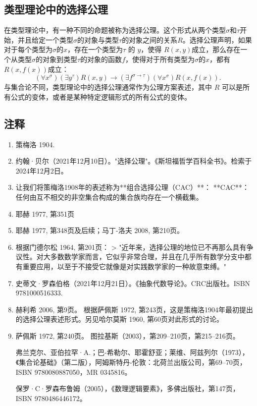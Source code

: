 \subsection{类型理论中的选择公理}  
在类型理论中，有一种不同的命题被称为选择公理。这个形式从两个类型\(\sigma\)和\(\tau\)开始，并且给定一个类型\(\sigma\)的对象与类型\(\tau\)的对象之间的关系\(R\)。选择公理声明，如果对于每个类型为\(\sigma\)的\(x\)，存在一个类型为\(\tau\) 的 \(y\)，使得 \(R(x,y)\)成立，那么存在一个从类型\(\sigma\)的对象到类型\(\tau\)的对象的函数\(f\)，使得对于所有类型为\(\sigma\)的\(x\)，都有\(R(x,f(x))\)成立：
\[
(\forall x^{\sigma})(\exists y^{\tau})R(x,y) \to (\exists f^{\sigma \to \tau})(\forall x^{\sigma})R(x,f(x)).~
\]
与集合论不同，类型理论中的选择公理通常作为公理方案表述，其中 \(R\) 可以是所有公式的变体，或者是某种特定逻辑形式的所有公式的变体。
\subsection{注释}  
\begin{enumerate}
\item 策梅洛 1904.  
\item 约翰·贝尔（2021年12月10日）。"选择公理"。《斯坦福哲学百科全书》。检索于2024年12月2日。  
\item 让我们将策梅洛1908年的表述称为**组合选择公理（CAC）**：  
**CAC**：任何由互不相交的非空集合构成的集合族均存在一个横截集。  

\item 耶赫 1977, 第351页  
\item 耶赫 1977, 第348页及后续；马丁-洛夫 2008, 第210页。  
\item 根据门德尔松 1964, 第201页：  
> "近年来，选择公理的地位已不再那么具有争议性。对大多数数学家而言，它似乎非常合理，并且在几乎所有数学分支中都有重要应用，以至于不接受它就像是对实践数学家的一种故意束缚。"  

\item 史蒂文·罗森伯格（2021年12月21日）。《抽象代数导论》。CRC出版社。ISBN 9781000516333.  

\item 赫利希 2006, 第9页。  
根据萨佩斯 1972, 第243页，这是策梅洛1904年最初提出的选择公理表述形式。另见哈尔莫斯 1960, 第60页对此形式的讨论。  

\item 萨佩斯 1972, 第240页。  
图拉基斯（2003），第209–210页，第215–216页。  

弗兰克尔、亚伯拉罕·A.；巴-希勒尔、耶霍舒亚；莱维、阿兹列尔（1973），《集合论基础》（第二版），阿姆斯特丹-伦敦：北荷兰出版公司，第69–70页，ISBN 9780080887050，MR 0345816。  

保罗·C·罗森布鲁姆（2005），《数理逻辑要素》，多佛出版社，第147页，ISBN 9780486446172。 
\end{enumerate} 

